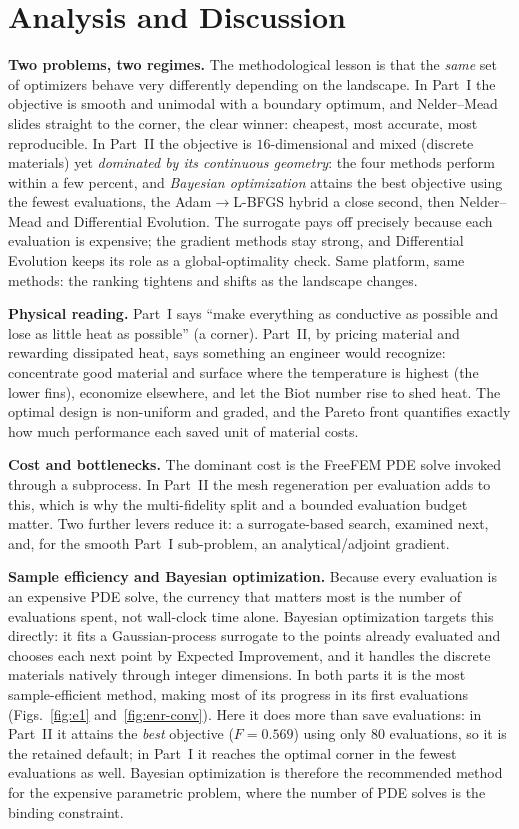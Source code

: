 \documentclass[11pt,a4paper]{article}
\begin{document}
\section{Analysis and Discussion}
\textbf{Two problems, two regimes.} The methodological lesson is that the \emph{same} set of optimizers
behave very differently depending on the landscape. In Part~I the objective is smooth and unimodal with
a boundary optimum, and Nelder--Mead slides straight to the corner, the clear winner: cheapest, most
accurate, most reproducible. In Part~II the objective is $16$-dimensional and mixed (discrete materials)
yet \emph{dominated by its continuous geometry}: the four methods perform within a few percent, and
\emph{Bayesian optimization} attains the best objective using the fewest evaluations, the
Adam$\rightarrow$L-BFGS hybrid a close second, then Nelder--Mead and Differential Evolution. The surrogate
pays off precisely because each evaluation is expensive; the gradient methods stay strong, and
Differential Evolution keeps its role as a global-optimality check. Same platform, same methods: the
ranking tightens and shifts as the landscape changes.

\textbf{Physical reading.} Part~I says ``make everything as conductive as possible and lose as little
heat as possible'' (a corner). Part~II, by pricing material and rewarding dissipated heat, says
something an engineer would recognize: concentrate good material and surface where the temperature is
highest (the lower fins), economize elsewhere, and let the Biot number rise to shed heat. The optimal
design is non-uniform and graded, and the Pareto front quantifies exactly how much performance each
saved unit of material costs.

\textbf{Cost and bottlenecks.} The dominant cost is the FreeFEM PDE solve invoked through a
subprocess. In Part~II the mesh regeneration per evaluation adds to this, which is why the
multi-fidelity split and a bounded evaluation budget matter. Two further levers reduce it: a
surrogate-based search, examined next, and, for the smooth Part~I sub-problem, an analytical/adjoint
gradient.

\textbf{Sample efficiency and Bayesian optimization.} Because every evaluation is an expensive PDE
solve, the currency that matters most is the number of evaluations spent, not wall-clock time alone.
Bayesian optimization targets this directly: it fits a Gaussian-process surrogate to the points already
evaluated and chooses each next point by Expected Improvement, and it handles the discrete materials
natively through integer dimensions. In both parts it is the most sample-efficient method, making most
of its progress in its first evaluations (Figs.~\ref{fig:e1} and~\ref{fig:enr-conv}). Here it does more
than save evaluations: in Part~II it attains the \emph{best} objective ($F=0.569$) using only $80$
evaluations, so it is the retained default; in Part~I it reaches the optimal corner in the fewest
evaluations as well. Bayesian optimization is therefore the recommended method for the expensive
parametric problem, where the number of PDE solves is the binding constraint.
\end{document}
